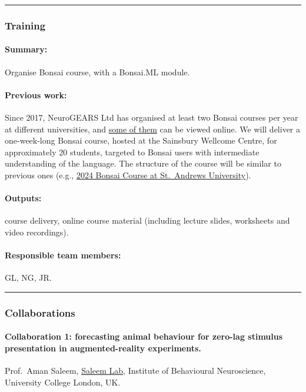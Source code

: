 \noindent\rule{\textwidth}{1pt}
\subsubsection*{Training}

\paragraph{Summary:} Organise Bonsai course, with a Bonsai.ML module.

\paragraph{Previous work:} Since 2017, NeuroGEARS Ltd has organised at least
two Bonsai courses per year at different universities, and
\href{https://bonsai-rx.org/learn/}{some of them} can be viewed online. We will
deliver a one-week-long Bonsai course, hosted at the Sainsbury Wellcome Centre,
for approximately 20 students, targeted to Bonsai users with intermediate
understanding of the language. The structure of the course will be similar to
previous ones (e.g., \href{https://neurogears.org/st-andrews-2024/}{2024 Bonsai
Course at St.~Andrews University}).

\paragraph{Outputs:} course delivery, online course material (including lecture
slides, worksheets and video recordings).

\paragraph{Responsible team members:} GL, NG, JR.

\noindent\rule{\textwidth}{1pt}
\subsubsection*{Collaborations}

\paragraph{Collaboration 1: forecasting animal behaviour for zero-lag stimulus
presentation in augmented-reality experiments.} Prof.~Aman Saleem,
\href{https://www.saleemlab.com/}{Saleem Lab}, Institute of Behavioural
Neuroscience, University College London, UK.


